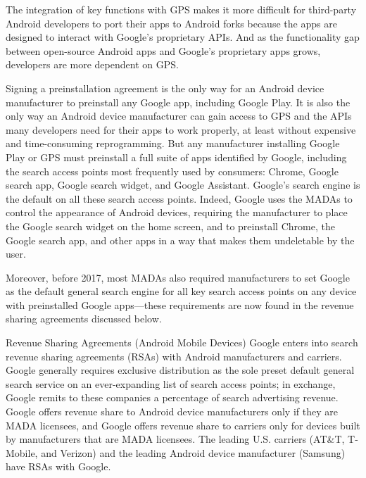 \documentclass[11pt,b5paper]{scrartcl}
\begin{document}

The integration of key functions with GPS makes it more difficult for third-party
Android developers to port their apps to Android forks because the apps are designed to interact
with Google’s proprietary APIs. And as the functionality gap between open-source Android apps
and Google’s proprietary apps grows, developers are more dependent on GPS.


Signing a preinstallation agreement is the only way for an Android device
manufacturer to preinstall any Google app, including Google Play. It is also the only way an
Android device manufacturer can gain access to GPS and the APIs many developers need for
their apps to work properly, at least without expensive and time-consuming reprogramming. But
any manufacturer installing Google Play or GPS must preinstall a full suite of apps identified by
Google, including the search access points most frequently used by consumers: Chrome, Google
search app, Google search widget, and Google Assistant. Google’s search engine is the default
on all these search access points. Indeed, Google uses the MADAs to control the appearance of
Android devices, requiring the manufacturer to place the Google search widget on the home
screen, and to preinstall Chrome, the Google search app, and other apps in a way that makes
them undeletable by the user.


Moreover, before 2017, most MADAs also required manufacturers to set Google
as the default general search engine for all key search access points on any device with
preinstalled Google apps—these requirements are now found in the revenue sharing agreements
discussed below.




Revenue Sharing Agreements (Android Mobile Devices)
Google enters into search revenue sharing agreements (RSAs) with Android
manufacturers and carriers. Google generally requires exclusive distribution as the sole preset
default general search service on an ever-expanding list of search access points; in exchange,
Google remits to these companies a percentage of search advertising revenue. Google offers
revenue share to Android device manufacturers only if they are MADA licensees, and Google
offers revenue share to carriers only for devices built by manufacturers that are MADA
licensees. The leading U.S. carriers (AT\&T, T-Mobile, and Verizon) and the leading Android
device manufacturer (Samsung) have RSAs with Google.
\end{document}
